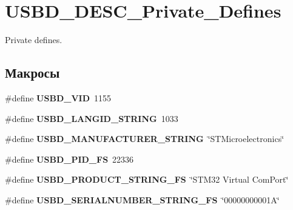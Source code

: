 \hypertarget{group___u_s_b_d___d_e_s_c___private___defines}{
\section{USBD\_\-DESC\_\-Private\_\-Defines}
\label{group___u_s_b_d___d_e_s_c___private___defines}
}
Private defines.  


\subsection*{Макросы}
\begin{CompactItemize}
\item 
\hypertarget{group___u_s_b_d___d_e_s_c___private___defines_gc5251397ce2246b546b472cd802e6d62}{
\#define \textbf{USBD\_\-VID}~1155}
\label{group___u_s_b_d___d_e_s_c___private___defines_gc5251397ce2246b546b472cd802e6d62}

\item 
\hypertarget{group___u_s_b_d___d_e_s_c___private___defines_g070dd542d4d914e86fdf103fa5fdd72f}{
\#define \textbf{USBD\_\-LANGID\_\-STRING}~1033}
\label{group___u_s_b_d___d_e_s_c___private___defines_g070dd542d4d914e86fdf103fa5fdd72f}

\item 
\hypertarget{group___u_s_b_d___d_e_s_c___private___defines_gee0c9fd7e8265b90126028919cd863a6}{
\#define \textbf{USBD\_\-MANUFACTURER\_\-STRING}~\char`\"{}STMicroelectronics\char`\"{}}
\label{group___u_s_b_d___d_e_s_c___private___defines_gee0c9fd7e8265b90126028919cd863a6}

\item 
\hypertarget{group___u_s_b_d___d_e_s_c___private___defines_ga6f9e36da39c9881963cabf42df4d216}{
\#define \textbf{USBD\_\-PID\_\-FS}~22336}
\label{group___u_s_b_d___d_e_s_c___private___defines_ga6f9e36da39c9881963cabf42df4d216}

\item 
\hypertarget{group___u_s_b_d___d_e_s_c___private___defines_ga11017e20e3a2f1ef891b86212c4b730}{
\#define \textbf{USBD\_\-PRODUCT\_\-STRING\_\-FS}~\char`\"{}STM32 Virtual ComPort\char`\"{}}
\label{group___u_s_b_d___d_e_s_c___private___defines_ga11017e20e3a2f1ef891b86212c4b730}

\item 
\hypertarget{group___u_s_b_d___d_e_s_c___private___defines_g0057246fa742e75846bb0467a84921fc}{
\#define \textbf{USBD\_\-SERIALNUMBER\_\-STRING\_\-FS}~\char`\"{}00000000001A\char`\"{}}
\label{group___u_s_b_d___d_e_s_c___private___defines_g0057246fa742e75846bb0467a84921fc}


\end{CompactItemize}
